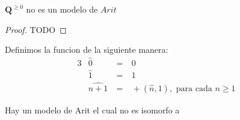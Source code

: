  \begin{remark}
    $\mathbf{Q}^{\geq 0}$ no es un modelo de $Arit$
    \begin{proof}
      TODO
    \end{proof}
  \end{remark}

  \begin{definition}
    Definimos la funcion  de la siguiente manera:
    \begin{alignat*}{3}
      &\widehat{0} &\ =&\ 0\\
      &\widehat{1} &\ =&\ 1\\
      &\widehat{n+1} &\ =&\ +(\widehat{n},1),\text{ para cada }n\geq1
    \end{alignat*}
  \end{definition}

  \begin{proposition}
    Hay un modelo de Arit el cual no es isomorfo a \pomega
  \end{proposition}

